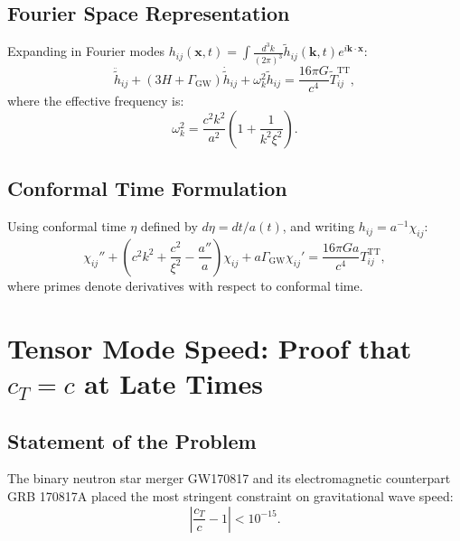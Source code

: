 \documentclass[11pt,a4paper]{article}
\newcommand{\cT}{\ensuremath{c_T}}
\theoremstyle{definition}
\theoremstyle{remark}
\begin{document}
\subsection{Fourier Space Representation}
\label{sec:fourier}

Expanding in Fourier modes $h_{ij}(\mathbf{x}, t) = \int \frac{d^3k}{(2\pi)^3} \tilde{h}_{ij}(\mathbf{k}, t) e^{i\mathbf{k}\cdot\mathbf{x}}$:
\begin{equation}
\label{eq:tensor_fourier}
\ddot{\tilde{h}}_{ij} + (3H + \Gamma_{\mathrm{GW}})\dot{\tilde{h}}_{ij} + \omega_k^2 \tilde{h}_{ij} = \frac{16\pi G}{c^4}\tilde{T}_{ij}^{\mathrm{TT}},
\end{equation}
where the effective frequency is:
\begin{equation}
\label{eq:omega_k}
\omega_k^2 = \frac{c^2 k^2}{a^2}\left(1 + \frac{1}{k^2\xi^2}\right).
\end{equation}

\subsection{Conformal Time Formulation}
\label{sec:conformal_time}

Using conformal time $\eta$ defined by $d\eta = dt/a(t)$, and writing $h_{ij} = a^{-1}\chi_{ij}$:
\begin{equation}
\label{eq:conformal_tensor}
\chi_{ij}'' + \left(c^2 k^2 + \frac{c^2}{\xi^2} - \frac{a''}{a}\right)\chi_{ij} + a\Gamma_{\mathrm{GW}}\chi_{ij}' = \frac{16\pi G a}{c^4}T_{ij}^{\mathrm{TT}},
\end{equation}
where primes denote derivatives with respect to conformal time.

\section{Tensor Mode Speed: Proof that $\cT = c$ at Late Times}
\label{sec:speed_proof}

\subsection{Statement of the Problem}
\label{sec:speed_problem}

The binary neutron star merger GW170817 and its electromagnetic counterpart GRB 170817A placed the most stringent constraint on gravitational wave speed:
\begin{equation}
\label{eq:gw170817_bound}
\left|\frac{\cT}{c} - 1\right| < 10^{-15}.
\end{equation}
\end{document}
